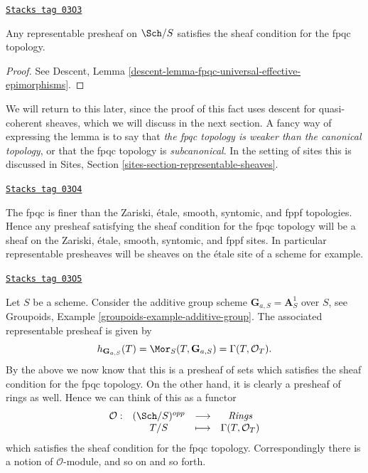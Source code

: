 \begin{lemma}
\label{etale-cohomology-lemma-representable-sheaf-fpqc}
\href{https://stacks.math.columbia.edu/tag/03O3}{\texttt{Stacks tag 03O3}}

Any representable presheaf on $\Sch/S$ satisfies the
sheaf condition for the fpqc topology.
\end{lemma}

\begin{proof}
See
Descent, Lemma \ref{descent-lemma-fpqc-universal-effective-epimorphisms}.
\end{proof}

We will return to this later, since the proof of this fact uses
descent for quasi-coherent sheaves, which we will discuss in the next
section. A fancy way of expressing the lemma is to say that
{\it the fpqc topology is weaker than the canonical topology}, or
that the fpqc topology is {\it subcanonical}. In the setting of sites
this is discussed in
Sites, Section \ref{sites-section-representable-sheaves}.

\begin{remark}
\label{etale-cohomology-remark-fpqc-finest}
\href{https://stacks.math.columbia.edu/tag/03O4}{\texttt{Stacks tag 03O4}}

The fpqc is finer than the Zariski, \'etale, smooth, syntomic, and fppf
topologies. Hence any presheaf
satisfying the sheaf condition for the fpqc topology will be a
sheaf on the Zariski, \'etale, smooth, syntomic, and fppf
sites. In particular
representable presheaves will be sheaves on the \'etale site of a scheme
for example.
\end{remark}

\begin{example}
\label{etale-cohomology-example-additive-group-sheaf}
\href{https://stacks.math.columbia.edu/tag/03O5}{\texttt{Stacks tag 03O5}}

Let $S$ be a scheme.
Consider the additive group scheme $\mathbf{G}_{a, S} = \mathbf{A}^1_S$
over $S$, see
Groupoids, Example \ref{groupoids-example-additive-group}.
The associated representable presheaf is given by
$$
h_{\mathbf{G}_{a, S}}(T) =
\Mor_S(T, \mathbf{G}_{a, S}) =
\Gamma(T, \mathcal{O}_T).
$$
By the above we now know that this is a presheaf of sets which satisfies the
sheaf condition for the fpqc topology. On the other hand, it is clearly
a presheaf of rings as well. Hence we can think of this as a functor
$$
\begin{matrix}
\mathcal{O} : &
(\Sch/S)^{opp} &
\longrightarrow &
\textit{Rings} \\
&
T/S &
\longmapsto &
\Gamma(T, \mathcal{O}_T)
\end{matrix}
$$
which satisfies the sheaf condition for the fpqc topology.
Correspondingly there is a notion of $\mathcal{O}$-module, and so on and
so forth.
\end{example}

